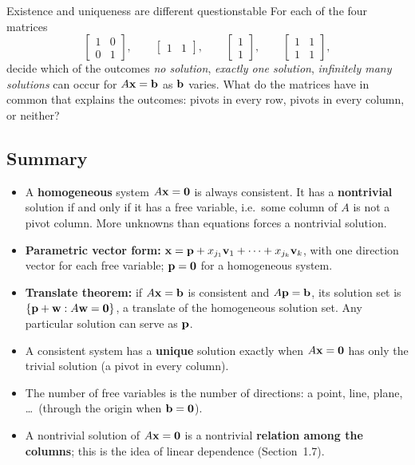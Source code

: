 \documentclass[11pt]{article}
\begin{document}
\begin{think}{Existence and uniqueness are different questions}{table}
For each of the four matrices
\[
\begin{bmatrix}1&0\\0&1\end{bmatrix},\qquad \begin{bmatrix}1&1\end{bmatrix},\qquad \begin{bmatrix}1\\1\end{bmatrix},\qquad \begin{bmatrix}1&1\\1&1\end{bmatrix},
\]
decide which of the outcomes \emph{no solution}, \emph{exactly one solution}, \emph{infinitely many solutions} can occur for $A\mathbf{x}=\mathbf{b}$ as $\mathbf{b}$ varies. What do the matrices have in common that explains the outcomes: pivots in every row, pivots in every column, or neither?
\end{think}

\subsection*{Summary}
\begin{itemize}
  \item A \textbf{homogeneous} system $A\mathbf{x}=\mathbf{0}$ is always consistent. It has a \textbf{nontrivial} solution if and only if it has a free variable, i.e.\ some column of $A$ is not a pivot column. More unknowns than equations forces a nontrivial solution.
  \item \textbf{Parametric vector form:} $\mathbf{x}=\mathbf{p}+x_{j_1}\mathbf{v}_1+\cdots+x_{j_k}\mathbf{v}_k$, with one direction vector for each free variable; $\mathbf{p}=\mathbf{0}$ for a homogeneous system.
  \item \textbf{Translate theorem:} if $A\mathbf{x}=\mathbf{b}$ is consistent and $A\mathbf{p}=\mathbf{b}$, its solution set is $\{\mathbf{p}+\mathbf{w} : A\mathbf{w}=\mathbf{0}\}$, a translate of the homogeneous solution set. Any particular solution can serve as $\mathbf{p}$.
  \item A consistent system has a \textbf{unique} solution exactly when $A\mathbf{x}=\mathbf{0}$ has only the trivial solution (a pivot in every column).
  \item The number of free variables is the number of directions: a point, line, plane, \dots\ (through the origin when $\mathbf{b}=\mathbf{0}$).
  \item A nontrivial solution of $A\mathbf{x}=\mathbf{0}$ is a nontrivial \textbf{relation among the columns}; this is the idea of linear dependence (Section~1.7).
\end{itemize}
\end{document}
